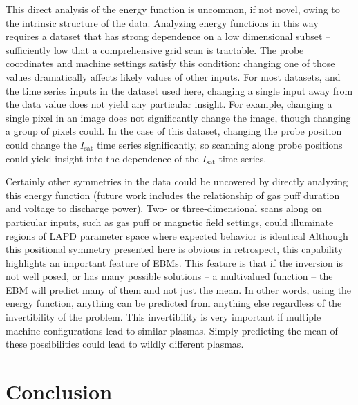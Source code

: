 This direct analysis of the energy function is uncommon, if not novel, owing to the intrinsic structure of the data. Analyzing energy functions in this way requires a dataset that has strong dependence on a low dimensional subset -- sufficiently low that a comprehensive grid scan is tractable. The probe coordinates and machine settings satisfy this condition: changing one of those values dramatically affects likely values of other inputs. For most datasets, and the time series inputs in the dataset used here, changing a single input away from the data value does not yield any particular insight. For example, changing a single pixel in an image does not significantly change the image, though changing a group of pixels could. In the case of this dataset, changing the probe position could change the $I_\text{sat}$ time series significantly, so scanning along probe positions could yield insight into the dependence of the $I_\text{sat}$ time series. 

Certainly other symmetries in the data could be uncovered by directly analyzing this energy function (future work includes the relationship of gas puff duration and voltage to discharge power). Two- or three-dimensional scans along on particular inputs, such as gas puff or magnetic field settings, could illuminate regions of LAPD parameter space where expected behavior is identical Although this positional symmetry presented here is obvious in retrospect, this capability highlights an important feature of EBMs. This feature is that if the inversion is not well posed, or has many possible solutions -- a multivalued function -- the EBM will predict many of them and not just the mean. In other words, using the energy function, anything can be predicted from anything else regardless of the invertibility of the problem. This invertibility is very important if multiple machine configurations lead to similar plasmas. Simply predicting the mean of these possibilities could lead to wildly different plasmas.


\section{Conclusion}

